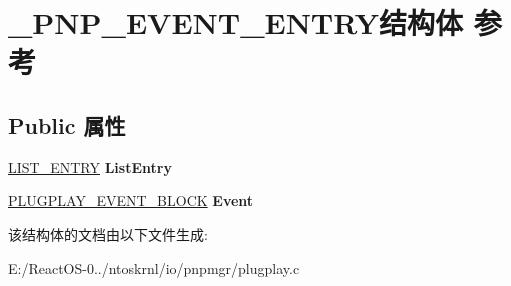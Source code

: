 \hypertarget{struct___p_n_p___e_v_e_n_t___e_n_t_r_y}{}\section{\+\_\+\+P\+N\+P\+\_\+\+E\+V\+E\+N\+T\+\_\+\+E\+N\+T\+R\+Y结构体 参考}
\label{struct___p_n_p___e_v_e_n_t___e_n_t_r_y}
\subsection*{Public 属性}
\begin{DoxyCompactItemize}
\item 
\mbox{\label{struct___p_n_p___e_v_e_n_t___e_n_t_r_y_a03aef9682bfcbbd7d153fbcd82f472c5}} 
\hyperlink{struct___l_i_s_t___e_n_t_r_y}{L\+I\+S\+T\+\_\+\+E\+N\+T\+RY} {\bfseries List\+Entry}
\item 
\mbox{\label{struct___p_n_p___e_v_e_n_t___e_n_t_r_y_a434e7c65be56b1f418c5d362ddc5fb59}} 
\hyperlink{struct___p_l_u_g_p_l_a_y___e_v_e_n_t___b_l_o_c_k}{P\+L\+U\+G\+P\+L\+A\+Y\+\_\+\+E\+V\+E\+N\+T\+\_\+\+B\+L\+O\+CK} {\bfseries Event}
\end{DoxyCompactItemize}


该结构体的文档由以下文件生成\+:\begin{DoxyCompactItemize}
\item 
E\+:/\+React\+O\+S-\/0../ntoskrnl/io/pnpmgr/plugplay.\+c\end{DoxyCompactItemize}
